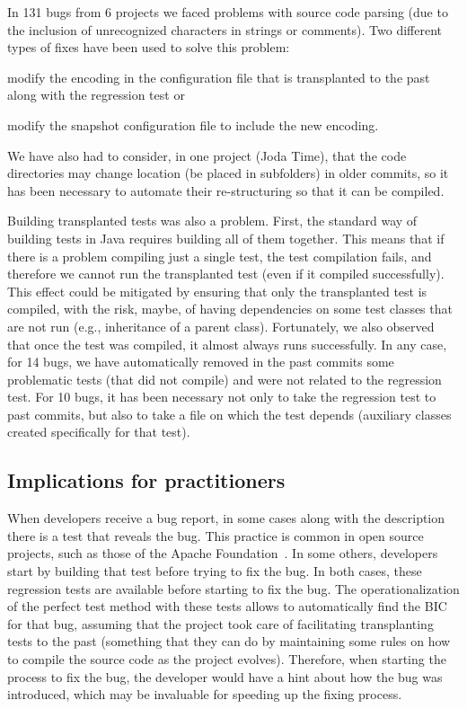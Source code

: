 In 131 bugs from 6 projects we faced problems with source code parsing (due to the inclusion of unrecognized characters in strings or comments). 
Two different types of fixes have been used to solve this problem: 
\begin{inparaenum}[\bf(1)]
    \item modify the encoding in the configuration file that is transplanted to the past along with the regression test or
    \item modify the snapshot configuration file to include the new encoding.
\end{inparaenum} 
We have also had to consider, in one project (Joda Time), that the code directories may change location (be placed in subfolders) in older commits, so it has been necessary to automate their re-structuring so that it can be compiled.

Building transplanted tests was also a problem. First, the standard way of building tests in Java requires building all of them together. 
This means that if there is a problem compiling just a single test, the test compilation fails, and therefore we cannot run the transplanted test (even if it compiled successfully).
This effect could be mitigated by ensuring that only the transplanted test is compiled, with the risk, maybe, of having dependencies on some test classes that are not run (e.g., inheritance of a parent class). Fortunately, we also observed that once the test was compiled, it almost always runs successfully.
In any case, for 14 bugs, we have automatically removed in the past commits some problematic tests (that did not compile) and were not related to the regression test.
For 10 bugs, it has been necessary not only to take the regression test to past commits, but also to take a file on which the test depends (auxiliary classes created specifically for that test).

\subsection{Implications for practitioners}
\label{sec:implications-practitioners}

When developers receive a bug report, in some cases along with the description there is a test that reveals the bug. 
This practice is common in open source projects, such as those of the Apache Foundation~\cite{iida2016improving}.
In some others, developers start by building that test before trying to fix the bug. In both cases, these regression tests are available before starting to fix the bug. The operationalization of the perfect test method with these tests allows to automatically find the BIC for that bug, assuming that the project took care of facilitating transplanting tests to the past (something that they can do by maintaining some rules on how to compile the source code as the project evolves). 
Therefore, when starting the process to fix the bug, the developer would have a hint about how the bug was introduced, which may be invaluable for speeding up the fixing process.

